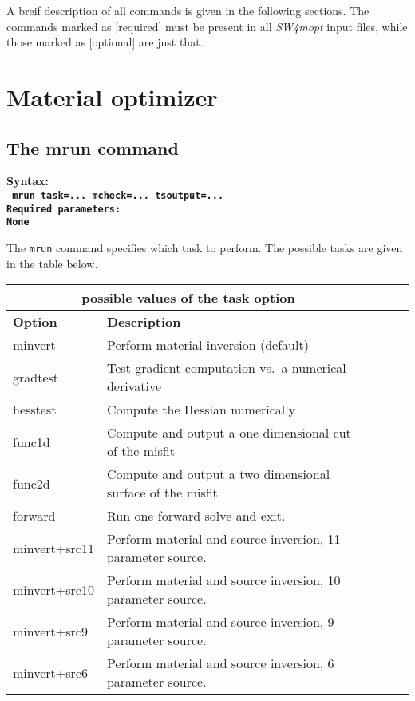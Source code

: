 \documentclass[12pt]{report}
\begin{document}
A breif description of all commands is given in the following sections. The commands marked as
[required] must be present in all \emph{SW4mopt} input files, while those marked as [optional] are just
that. 

\section{Material optimizer}

\subsection{The mrun command}\label{sec:mrun}
\begin{flushleft}\bf
Syntax:\\
\tt
mrun task=... mcheck=... tsoutput=... 
\\
\bf Required parameters:\\
\rm
None
\end{flushleft}
The \verb+mrun+ command specifies which task to perform. The possible tasks are
given in the table below. 
\begin{center}
\begin{tabular}{|l|p{8cm}|l|l|l|} \hline
\multicolumn{2}{|c|}{\bf possible values of the task option}\\ \hline
{\bf Option} & {\bf Description}           \\ \hline 
\hline
minvert     & Perform material inversion (default) \\ \hline
gradtest    & Test gradient computation vs.~a numerical derivative \\ \hline
hesstest    & Compute the Hessian numerically  \\ \hline
func1d      & Compute and output a one dimensional cut of the misfit \\ \hline
func2d      & Compute and output a two dimensional surface of the misfit \\ \hline
forward     & Run one forward solve and exit. \\ \hline
minvert+src11& Perform material and source inversion, 11 parameter source. \\ \hline
minvert+src10& Perform material and source inversion, 10 parameter source. \\ \hline
minvert+src9& Perform material and source inversion, 9 parameter source. \\ \hline
minvert+src6& Perform material and source inversion, 6 parameter source. \\ \hline
\end{tabular}
\end{center}
\end{document}
